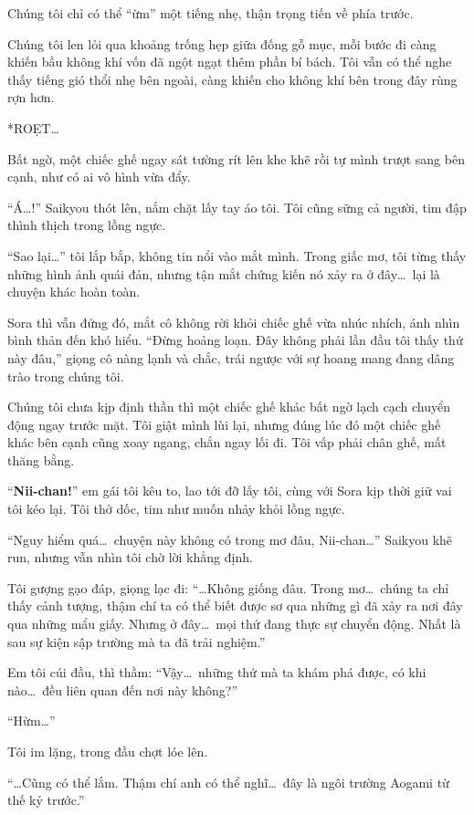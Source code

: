 \documentclass[../main.tex]{subfiles}
\begin{document}
Chúng tôi chỉ có thể ``ừm'' một tiếng nhẹ, thận trọng tiến về phía trước.

Chúng tôi len lỏi qua khoảng trống hẹp giữa đống gỗ mục, mỗi bước đi càng khiến bầu không khí vốn đã ngột ngạt thêm phần bí bách. Tôi vẫn có thể nghe thấy tiếng gió thổi nhẹ bên ngoài, càng khiến cho không khí bên trong đây rùng rợn hơn.

*ROẸT\dots*

Bất ngờ, một chiếc ghế ngay sát tường rít lên khe khẽ rồi tự mình trượt sang bên cạnh, như có ai vô hình vừa đẩy.

``Á\dots!'' Saikyou thót lên, nắm chặt lấy tay áo tôi. Tôi cũng sững cả người, tim đập thình thịch trong lồng ngực.

``Sao lại\dots'' tôi lắp bắp, không tin nổi vào mắt mình. Trong giấc mơ, tôi từng thấy những hình ảnh quái đản, nhưng tận mắt chứng kiến nó xảy ra ở đây\dots\ lại là chuyện khác hoàn toàn.

Sora thì vẫn đứng đó, mắt cô không rời khỏi chiếc ghế vừa nhúc nhích, ánh nhìn bình thản đến khó hiểu. ``Đừng hoảng loạn. Đây không phải lần đầu tôi thấy thứ này đâu,'' giọng cô nàng lạnh và chắc, trái ngược với sự hoang mang đang dâng trào trong chúng tôi.

Chúng tôi chưa kịp định thần thì một chiếc ghế khác bất ngờ lạch cạch chuyển động ngay trước mặt. Tôi giật mình lùi lại, nhưng đúng lúc đó một chiếc ghế khác bên cạnh cũng xoay ngang, chắn ngay lối đi. Tôi vấp phải chân ghế, mất thăng bằng.

``\textbf{Nii-chan!}'' em gái tôi kêu to, lao tới đỡ lấy tôi, cùng với Sora kịp thời giữ vai tôi kéo lại. Tôi thở dốc, tim như muốn nhảy khỏi lồng ngực.

``Nguy hiểm quá\dots\ chuyện này không có trong mơ đâu, Nii-chan\dots'' Saikyou khẽ run, nhưng vẫn nhìn tôi chờ lời khẳng định.

Tôi gượng gạo đáp, giọng lạc đi: ``\dots Không giống đâu. Trong mơ\dots\ chúng ta chỉ thấy cảnh tượng, thậm chí ta có thể biết được sơ qua những gì đã xảy ra nơi đây qua những mẩu giấy. Nhưng ở đây\dots\ mọi thứ đang thực sự chuyển động. Nhất là sau sự kiện sập trường mà ta đã trải nghiệm.''

Em tôi cúi đầu, thì thầm: ``Vậy\dots\ những thứ mà ta khám phá được, có khi nào\dots\ đều liên quan đến nơi này không?''

``Hừm\dots''

Tôi im lặng, trong đầu chợt lóe lên.

``\dots Cũng có thể lắm. Thậm chí anh có thể nghĩ\dots\ đây là ngôi trường Aogami từ thế kỷ trước.''
\end{document}
